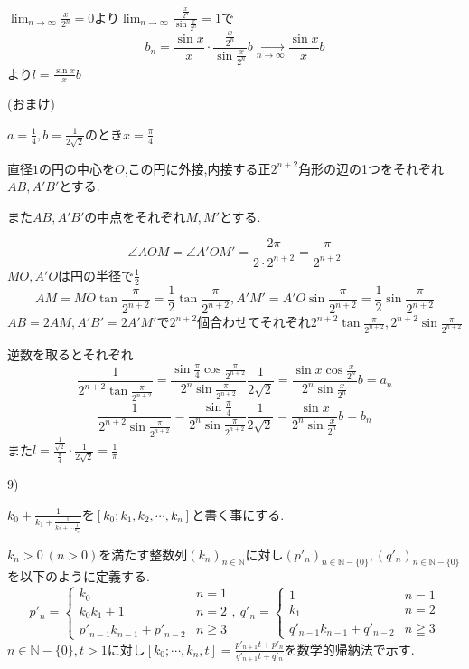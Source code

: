 \documentclass{jsarticle}
\begin{document}
$\displaystyle \lim_{n\to\infty}\frac{x}{2^n}=0$より$\displaystyle \lim_{n\to\infty}\frac{\frac{x}{2^n}}{\sin \frac{x}{2^n}}=1$で
\[b_n= \frac{\sin x}{x}\cdot\frac{\frac{x}{2^n}}{\sin \frac{x}{2^n}}b\xrightarrow[n\to\infty]{} \frac{\sin x}{x}b\]
より$l=\frac{\sin x}{x}b$

(おまけ)

$a=\frac{1}{4},b=\frac{1}{2\sqrt{2}}$のとき$x=\frac{\pi}{4}$

直径$1$の円の中心を$O$,この円に外接,内接する正$2^{n+2}$角形の辺の1つをそれぞれ$AB,A'B'$とする.

また$AB,A'B'$の中点をそれぞれ$M,M'$とする.

\[\angle AOM = \angle A'OM' = \frac{2\pi}{2\cdot 2^{n+2}}=\frac{\pi}{2^{n+2}}\]
$MO,A'O$は円の半径で$\frac{1}{2}$
\[AM=MO\tan \frac{\pi}{2^{n+2}} = \frac{1}{2}\tan\frac{\pi}{2^{n+2}},A'M' =A'O\sin \frac{\pi}{2^{n+2}} = \frac{1}{2}\sin\frac{\pi}{2^{n+2}}\]
$AB=2AM,A'B'=2A'M'$で$2^{n+2}$個合わせてそれぞれ$2^{n+2}\tan\frac{\pi}{2^{n+2}},2^{n+2}\sin\frac{\pi}{2^{n+2}}$

逆数を取るとそれぞれ
\[\frac{1}{2^{n+2}\tan\frac{\pi}{ 2^{n+2}}}=\frac{\sin \frac{\pi}{4}\cos\frac{\pi}{2^{n+2}}}{2^n\sin\frac{\pi}{2^{n+2}}}\frac{1}{2\sqrt{2}}=\frac{\sin x\cos \frac{x}{2^n}}{2^n\sin\frac{x}{2^n}}b=a_n\]
\[\frac{1}{2^{n+2}\sin\frac{\pi}{ 2^{n+2}}}=\frac{\sin \frac{\pi}{4}}{2^n\sin\frac{\pi}{2^{n+2}}}\frac{1}{2\sqrt{2}}=\frac{\sin x}{2^n\sin\frac{x}{2^n}}b=b_n\]
また$l=\frac{\frac{1}{\sqrt{2}}}{\frac{\pi}{4}}\cdot \frac{1}{2\sqrt{2}}=\frac{1}{\pi}$

9)

$k_0+\frac{1}{k_1+\frac{1}{k_2+\cdots \frac{1}{k_n}}}$を$[k_0;k_1,k_2,\cdots,k_n]$と書く事にする.

$k_n>0 \ (n > 0)$を満たす整数列$(k_n)_{n\in\mathbb{N}}$に対し$(p'_n)_{n\in\mathbb{N}-\{0\}},(q'_n)_{n\in\mathbb{N}-\{0\}}$を以下のように定義する.
\[p'_n=\begin{cases}
k_0 & n=1 \\
k_0k_1+1 & n=2 \\
p'_{n-1}k_{n-1}+p'_{n-2} & n\geqq 3
\end{cases}, \ q'_n=\begin{cases}
1 & n=1 \\
k_1 & n=2 \\
q'_{n-1}k_{n-1}+q'_{n-2} & n\geqq 3
\end{cases}\]
$n\in \mathbb{N}-\{0\},t>1$に対し$[k_0;\cdots ,k_n,t]=\frac{p'_{n+1}t+p'_n}{q'_{n+1}t+q'_n}$を数学的帰納法で示す.
\end{document}
